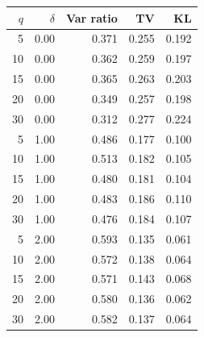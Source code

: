 \begin{tabular}{rrrrr}
\hline
$q$ & $\delta$ & Var ratio & TV & KL \\
\hline
5 & 0.00 & 0.371 & 0.255 & 0.192 \\
10 & 0.00 & 0.362 & 0.259 & 0.197 \\
15 & 0.00 & 0.365 & 0.263 & 0.203 \\
20 & 0.00 & 0.349 & 0.257 & 0.198 \\
30 & 0.00 & 0.312 & 0.277 & 0.224 \\
5 & 1.00 & 0.486 & 0.177 & 0.100 \\
10 & 1.00 & 0.513 & 0.182 & 0.105 \\
15 & 1.00 & 0.480 & 0.181 & 0.104 \\
20 & 1.00 & 0.483 & 0.186 & 0.110 \\
30 & 1.00 & 0.476 & 0.184 & 0.107 \\
5 & 2.00 & 0.593 & 0.135 & 0.061 \\
10 & 2.00 & 0.572 & 0.138 & 0.064 \\
15 & 2.00 & 0.571 & 0.143 & 0.068 \\
20 & 2.00 & 0.580 & 0.136 & 0.062 \\
30 & 2.00 & 0.582 & 0.137 & 0.064 \\
\hline
\end{tabular}
